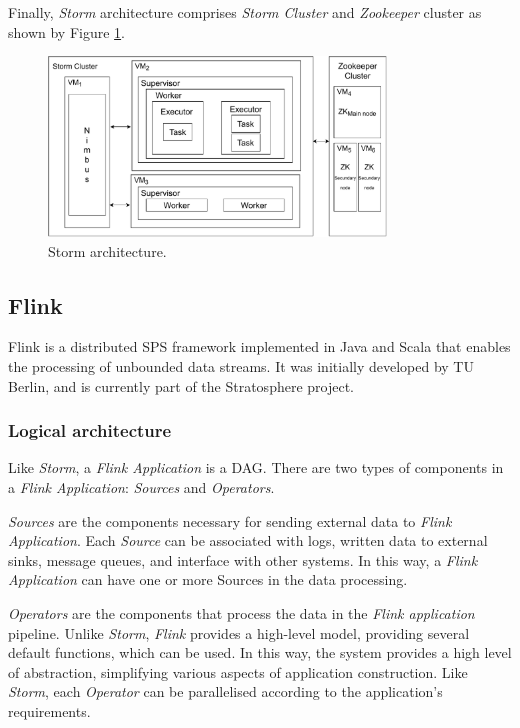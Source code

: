 Finally, \textit{Storm} architecture comprises \textit{Storm Cluster} and \textit{Zookeeper} cluster as shown by Figure \ref{fig:storm-architecture}.

\begin{figure}[!ht]
     \centering
     \includegraphics[width=0.8\textwidth]{figures/concepts/Storm-Architecture.pdf}
     \caption{Storm architecture.}
     \label{fig:storm-architecture}
\end{figure}

\subsection{Flink}
Flink \cite{Katsifodimos2016Flink} is a distributed SPS framework implemented in Java and Scala that enables the processing of unbounded data streams. It was initially developed by TU Berlin, and is currently part of the Stratosphere project.

\subsubsection{Logical architecture}

Like \textit{Storm}, a \textit{Flink Application} is a DAG. There are two types of components in a \textit{Flink Application}: \textit{Sources} and \textit{Operators}.

\textit{Sources} are the components necessary for sending external data to \textit{Flink Application}. Each \textit{Source} can be associated with logs, written data to external sinks, message queues, and interface with other systems. In this way, a \textit{Flink Application} can have one or more Sources in the data processing.

\textit{Operators} are the components that process the data in the \textit{Flink application} pipeline. Unlike \textit{Storm}, \textit{Flink} provides a high-level model, providing several default functions, which can be used. In this way, the system provides a high level of abstraction, simplifying various aspects of application construction. Like \textit{Storm}, each \textit{Operator} can be parallelised according to the application's requirements.

